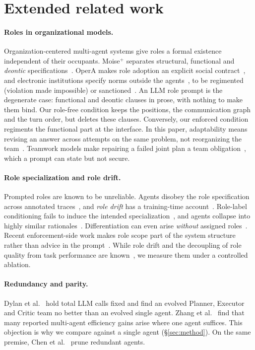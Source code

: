 \section{Extended related work}
\label{app:related}

\paragraph{Roles in organizational models.} Organization-centered
multi-agent systems give roles a formal existence independent of their
occupants. Moise$^+$ separates structural, functional and \emph{deontic}
specifications~\cite{hubner2002moise}. OperA makes role adoption an explicit
social contract~\cite{dignum2004opera}, and electronic institutions specify
norms outside the agents~\cite{esteva2001formal}, to be regimented
(violation made impossible) or sanctioned~\cite{grossi2007ubilex}. An LLM
role prompt is the degenerate case: functional and deontic clauses in prose,
with nothing to make them bind. Our role-free condition keeps the positions,
the communication graph and the turn order, but deletes these clauses.
Conversely, our enforced condition regiments the functional part at the
interface. In this paper, adaptability means revising an answer across
attempts on the same problem, not reorganizing the
team~\cite{horling2004survey}. Teamwork models make repairing a failed joint
plan a team obligation~\cite{tambe1997flexible}, which a prompt can state
but not secure.

\paragraph{Role specialization and role drift.} Prompted roles are known to
be unreliable. Agents disobey the role specification across annotated
traces~\cite{cemri2025why}, and \emph{role drift} has a training-time
account~\cite{cao2026modules}. Role-label conditioning fails to induce the
intended specialization~\cite{orogat2026architectural}, and agents collapse
into highly similar rationales~\cite{patel2026representational}.
Differentiation can even arise \emph{without} assigned
roles~\cite{kandoussi2026whoami}. Recent enforcement-side work makes role
scope part of the system structure rather than advice in the
prompt~\cite{stettler2026progressive,ge2026roles}. While role drift and the
decoupling of role quality from task performance are
known~\cite{cao2026modules,yang2026precise}, we measure them under a
controlled ablation.

\paragraph{Redundancy and parity.} Dylan et al.~\cite{dylan2026equal} hold
total LLM calls fixed and find an evolved Planner, Executor and Critic team
no better than an evolved single agent. Zhang et
al.~\cite{zhang2026rethinking} find that many reported multi-agent
efficiency gains arise where one agent suffices. This objection is why we
compare against a single agent (\S\ref{sec:method}). On the same premise,
Chen et al.~\cite{chen2026agentslimming} prune redundant agents.

